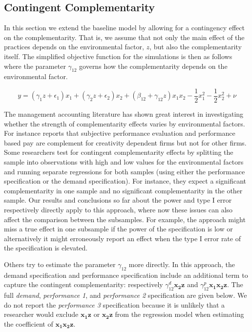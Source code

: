 \documentclass[12pt]{article}
\begin{document}


\subsection{Contingent Complementarity}

In this section we extend the baseline model by allowing for a contingency effect on the complementarity. That is, we assume that not only the main effect of the practices depends on the environmental factor, $z$, but also the complementarity itself. The simplified objective function for the simulations is then as follows where the parameter $\gamma_{12}$ governs how the complementarity depends on the environmental factor. 

\begin{equation}
\label{eq:contingent-complement}
y = (\gamma_1 z + \epsilon_1) x_1 + (\gamma_2 z + \epsilon_2) x_2 + 
    (\beta_{12} + \gamma_{12} z) x_1 x_2 - \frac{1}{2} x^2_1 - \frac{1}{2} x^2_2 + \nu
\end{equation}

The management accounting literature has shown great interest in investigating whether the strength of complementarity effects varies by environmental factors. For instance \citet{grabner_incentive_2014} reports that subjective performance evaluation and performance based pay are complement for creativity dependent firms but not for other firms. Some researchers test for contingent complementarity effects by splitting the sample into observations with high and low values for the environmental factors and running separate regressions for both samples (using either the performance specification or the demand specification). For instance, they expect a significant complementarity in one sample and no significant complementarity in the other sample. Our results and conclusions so far about the power and type I error respectively directly apply to this approach, where now these issues can also affect the comparison between the subsamples. For example, the approach might miss a true effect in one subsample if the power of the specification is low or alternatively it might erroneously report an effect when the type I error rate of the specification is elevated. 



Others try to estimate the parameter $\gamma_{12}$ more directly. In this approach, the demand specification and performance specification include an additional term to capture the contingent complementarity: respectively $\gamma^d_{12} \mathbf{x_2 z}$ and $\gamma^p_{12} \mathbf{x_1 x_2 z}$. The full \emph{demand}, \emph{performance 1}, and \emph{performance 2} specification are given below. We do not report the \emph{performance 3} specification because it is unlikely that a researcher would exclude $\mathbf{x_1 z}$ or $\mathbf{x_2 z}$ from the regression model when estimating the coefficient of $\mathbf{x_1 x_2 z}$.
\end{document}

